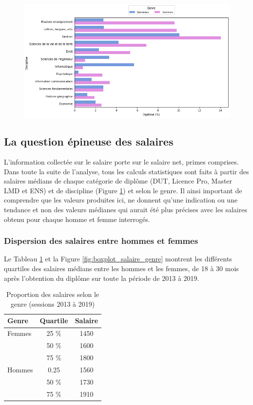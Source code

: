 \documentclass[12pt, a4paper, titlepage, table]{article}
\begin{document}
	
	

	\begin{figure}[H]
		\centering
		\includegraphics[width=1\textwidth]{../graphs/proportion_disciplines.png}
		\label{fig:genre_discipline}
	\end{figure}

\subsection{La question épineuse des salaires}
L’information collectée sur le salaire porte sur le salaire net, primes comprises. Dans toute la suite de l'analyse, tous les calculs statistiques sont faits à partir des salaires médians de chaque catégorie de diplôme (DUT, Licence Pro, Master LMD et ENS) et de discipline (Figure \ref{fig:genre_discipline}) et selon le genre. Il ainsi important de comprendre que les valeurs produites ici,  ne donnent qu'une indication ou une tendance et non des valeurs médianes qui aurait été plus précises avec les salaires obtenu pour chaque homme et femme interrogés.
 

	\subsubsection{Dispersion des salaires entre hommes et femmes}	
	Le Tableau \ref{tab:quartile_salaire_genre} et la Figure \ref{fig:boxplot_salaire_genre} montrent les différents quartiles des salaires médians entre les hommes et les femmes, de 18 à 30 mois après l'obtention du diplôme sur toute la période de 2013 à 2019.
	
	\begin{table}[H]
		\centering
		\begin{tabular}{lcc}
			\toprule
			\textbf{Genre} & \textbf{Quartile} & \textbf{Salaire} \\
			\midrule
			Femmes & 25 \% & 1450 \\
			& 50 \% & 1600 \\
			& 75 \% & 1800 \\
			\midrule
			Hommes & 0.25 & 1560 \\
			& 50 \% & 1730 \\
			& 75 \%& 1910 \\
			\bottomrule
		\end{tabular}
		\caption{Proportion des salaires selon le genre (sessions 2013 à 2019)}
		\label{tab:quartile_salaire_genre}
	\end{table}
	
\end{document}
